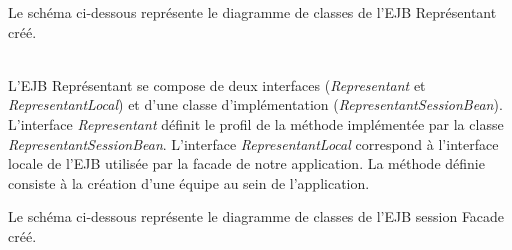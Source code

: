 \documentclass[10pt]{report}
\begin{document}
\newpage
Le schéma ci-dessous représente le diagramme de classes de l'EJB Représentant créé.
\\
	\begin{figure}[hp]
	      \begin{center}
	      \end{center}
	\end{figure}
\\
	
L'EJB Représentant se compose de deux interfaces (\textit{Representant} et \textit{RepresentantLocal}) et d'une classe d'implémentation (\textit{RepresentantSessionBean}). L'interface \textit{Representant} définit le profil de la méthode implémentée par la classe \textit{RepresentantSessionBean}. L'interface \textit{RepresentantLocal} correspond à l'interface locale de l'EJB utilisée par la facade de notre application. La méthode définie consiste à la création d'une équipe au sein de l'application.

\newpage
Le schéma ci-dessous représente le diagramme de classes de l'EJB session Facade créé.
\\
	\begin{figure}[hp]
	      \begin{center}
	      \end{center}
	\end{figure}	
\\
\end{document}
